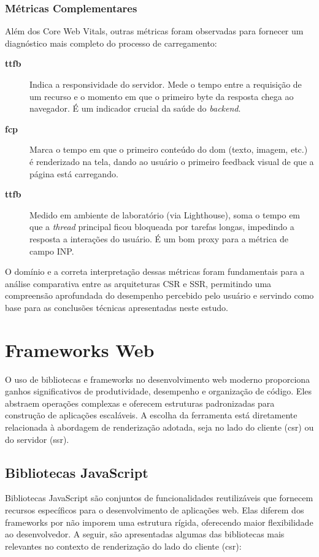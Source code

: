 \subsubsection{Métricas Complementares}
Além dos Core Web Vitals, outras métricas foram observadas para fornecer um diagnóstico mais completo do processo de carregamento:
\begin{description}
    \item[\textbf{\acrfull{ttfb}}] Indica a responsividade do servidor. Mede o tempo entre a requisição de um recurso e o momento em que o primeiro byte da resposta chega ao navegador. É um indicador crucial da saúde do \textit{backend}.
    \item[\textbf{\acrfull{fcp}}] Marca o tempo em que o primeiro conteúdo do \acrshort{dom} (texto, imagem, etc.) é renderizado na tela, dando ao usuário o primeiro feedback visual de que a página está carregando.
    \item[\textbf{\acrfull{ttfb}}] Medido em ambiente de laboratório (via Lighthouse), soma o tempo em que a \textit{thread} principal ficou bloqueada por tarefas longas, impedindo a resposta a interações do usuário. É um bom proxy para a métrica de campo INP.
\end{description}
O domínio e a correta interpretação dessas métricas foram fundamentais para a análise comparativa entre as arquiteturas CSR e SSR, permitindo uma compreensão aprofundada do desempenho percebido pelo usuário e servindo como base para as conclusões técnicas apresentadas neste estudo.

\section{Frameworks Web}
\label{sec:frameworks-web}

O uso de bibliotecas e frameworks no desenvolvimento web moderno proporciona ganhos significativos de produtividade, desempenho e organização de código. Eles abstraem operações complexas e oferecem estruturas padronizadas para construção de aplicações escaláveis. A escolha da ferramenta está diretamente relacionada à abordagem de renderização adotada, seja no lado do cliente (\acrshort{csr}) ou do servidor (\acrshort{ssr}).

\subsection{Bibliotecas JavaScript}
\label{subsec:bibliotecas-js}

Bibliotecas JavaScript são conjuntos de funcionalidades reutilizáveis que fornecem recursos específicos para o desenvolvimento de aplicações web. Elas diferem dos frameworks por não imporem uma estrutura rígida, oferecendo maior flexibilidade ao desenvolvedor. A seguir, são apresentadas algumas das bibliotecas mais relevantes no contexto de renderização do lado do cliente (\acrshort{csr}):


